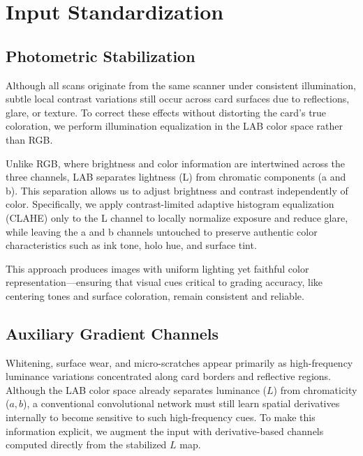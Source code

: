 \documentclass[12pt]{article}
\begin{document}
\section{Input Standardization}

\subsection{Photometric Stabilization}
Although all scans originate from the same scanner under consistent illumination, subtle local contrast variations still occur across card surfaces due to reflections, glare, or texture.
To correct these effects without distorting the card’s true coloration, we perform illumination equalization in the LAB color space rather than RGB.

Unlike RGB, where brightness and color information are intertwined across the three channels, LAB separates lightness (L) from chromatic components (a and b).
This separation allows us to adjust brightness and contrast independently of color.
Specifically, we apply contrast-limited adaptive histogram equalization (CLAHE) only to the L channel to locally normalize exposure and reduce glare, while leaving the a and b channels untouched to preserve authentic color characteristics such as ink tone, holo hue, and surface tint.

This approach produces images with uniform lighting yet faithful color representation—ensuring that visual cues critical to grading accuracy, like centering tones and surface coloration, remain consistent and reliable.

\subsection{Auxiliary Gradient Channels}
Whitening, surface wear, and micro-scratches appear primarily as high-frequency luminance variations concentrated along card borders and reflective regions. 
Although the LAB color space already separates luminance ($L$) from chromaticity ($a,b$), a conventional convolutional network must still learn spatial derivatives internally to become sensitive to such high-frequency cues. 
To make this information explicit, we augment the input with derivative-based channels computed directly from the stabilized $L$ map.
\end{document}
